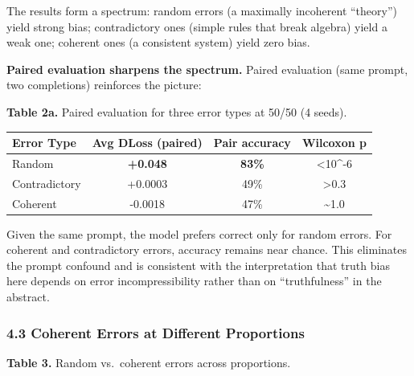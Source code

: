\documentclass[
  11pt,
]{article}
\newcounter{none} %
\begin{document}
The results form a spectrum: random errors (a maximally incoherent
``theory'') yield strong bias; contradictory ones (simple rules that
break algebra) yield a weak one; coherent ones (a consistent system)
yield zero bias.

\textbf{Paired evaluation sharpens the spectrum.} Paired evaluation
(same prompt, two completions) reinforces the picture:

\textbf{Table 2a.} Paired evaluation for three error types at 50/50 (4
seeds).

{\def\LTcaptype{none} %
\begin{longtable}[]{@{}lccc@{}}
\toprule\noalign{}
Error Type & Avg DLoss (paired) & Pair accuracy & Wilcoxon p \\
\midrule\noalign{}
\endhead
\bottomrule\noalign{}
\endlastfoot
Random & \textbf{+0.048} & \textbf{83\%} & \textless10\^{}-6 \\
Contradictory & +0.0003 & 49\% & \textgreater0.3 \\
Coherent & -0.0018 & 47\% & \textasciitilde1.0 \\
\end{longtable}
}

Given the same prompt, the model prefers correct only for random errors.
For coherent and contradictory errors, accuracy remains near chance.
This eliminates the prompt confound and is consistent with the
interpretation that truth bias here depends on error incompressibility
rather than on ``truthfulness'' in the abstract.

\subsubsection{4.3 Coherent Errors at Different
Proportions}\label{coherent-errors-at-different-proportions}

\textbf{Table 3.} Random vs.~coherent errors across proportions.
\end{document}
